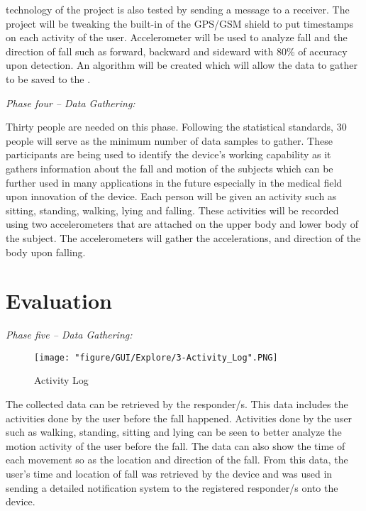  technology of the project is also tested by sending a message to a receiver. The project will be tweaking the built-in  of the GPS/GSM shield to put timestamps on each activity of the user. Accelerometer will be used to analyze fall and the direction of fall such as forward, backward and sideward with 80\% of accuracy upon detection. An algorithm will be created which will allow the data to gather to be saved to the .

\noindent \textit{Phase four – Data Gathering:}

Thirty people are needed on this phase. Following the statistical standards, 30 people will serve as the minimum number of data samples to gather. These participants are being used to identify the device’s working capability as it gathers information about the fall and motion of the subjects which can be further used in many applications in the future especially in the medical field upon innovation of the device.  Each person will be given an activity such as sitting, standing, walking, lying and falling. These activities will be recorded using two accelerometers that are attached on the upper body and lower body of the subject.  The accelerometers will gather the accelerations, and direction of the body upon falling.

\section{Evaluation}
\label{sec:evaluate}

\noindent \textit{Phase five – Data Gathering:}

\begin{figure}[htbp]
	\centering
		\texttt{[image: "figure/GUI/Explore/3-Activity\_Log".PNG]}
	\caption{Activity Log}
	\label{fig:3-Activity_Log}
\end{figure}

The collected data can be retrieved by the responder/s. This data includes the activities done by the user before the fall happened. Activities done by the user such as walking, standing, sitting and lying can be seen to better analyze the motion activity of the user before the fall. The data can also show the time of each movement so as the location and direction of the fall. From this data, the user’s time and location of fall was retrieved by the device and was used in sending a detailed notification system to the registered responder/s onto the device.